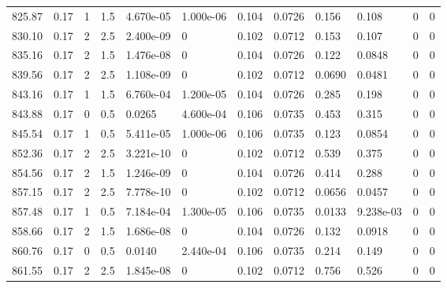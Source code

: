 \documentclass[preview]{standalone}
\begin{document}
{{{{{{\begin{tabular}{L{1.2cm}C{1.2cm} C{0.3cm}C{0.5cm} C{1.4cm}C{1.4cm} C{1.4cm}C{1.4cm} C{1.6cm}C{1.6cm} C{1.6cm}C{1.6cm}}
  825.87  &  0.17  & 1     & 1.5 &  4.670e-05  & 1.000e-06  &  0.104&   0.0726& 0.156 & 0.108   &  0 & 0  \\ 
  830.10  &  0.17  & 2     & 2.5 &  2.400e-09  & 0  &  0.102&   0.0712& 0.153 & 0.107   &  0 & 0  \\ 
  835.16  &  0.17  & 2     & 1.5 &  1.476e-08  & 0  &  0.104&   0.0726& 0.122 & 0.0848   &  0 & 0  \\ 
  839.56  &  0.17  & 2     & 2.5 &  1.108e-09  & 0  &  0.102&   0.0712& 0.0690 & 0.0481   &  0 & 0  \\ 
  843.16  &  0.17  & 1     & 1.5 &  6.760e-04  & 1.200e-05  &  0.104&   0.0726& 0.285 & 0.198   &  0 & 0  \\ 
  843.88  &  0.17  & 0     & 0.5 &  0.0265  & 4.600e-04  &  0.106&   0.0735& 0.453 & 0.315   &  0 & 0  \\ 
  845.54  &  0.17  & 1     & 0.5 &  5.411e-05  & 1.000e-06  &  0.106&   0.0735& 0.123 & 0.0854   &  0 & 0  \\ 
  852.36  &  0.17  & 2     & 2.5 &  3.221e-10  & 0  &  0.102&   0.0712& 0.539 & 0.375   &  0 & 0  \\ 
  854.56  &  0.17  & 2     & 1.5 &  1.246e-09  & 0  &  0.104&   0.0726& 0.414 & 0.288   &  0 & 0  \\ 
  857.15  &  0.17  & 2     & 2.5 &  7.778e-10  & 0  &  0.102&   0.0712& 0.0656 & 0.0457   &  0 & 0  \\ 
  857.48  &  0.17  & 1     & 0.5 &  7.184e-04  & 1.300e-05  &  0.106&   0.0735& 0.0133 & 9.238e-03   &  0 & 0  \\ 
  858.66  &  0.17  & 2     & 1.5 &  1.686e-08  & 0  &  0.104&   0.0726& 0.132 & 0.0918   &  0 & 0  \\ 
  860.76  &  0.17  & 0     & 0.5 &  0.0140  & 2.440e-04  &  0.106&   0.0735& 0.214 & 0.149   &  0 & 0  \\ 
  861.55  &  0.17  & 2     & 2.5 &  1.845e-08  & 0  &  0.102&   0.0712& 0.756 & 0.526   &  0 & 0  \\ 
\hline 
\end{tabular} 

}}}}}}
\end{document}
